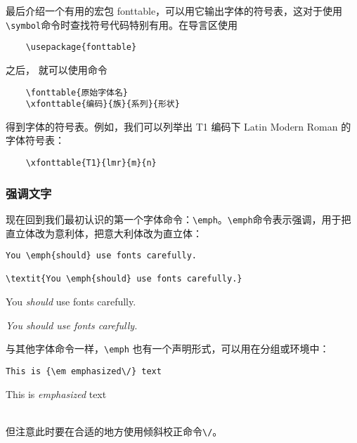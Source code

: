 最后介绍一个有用的宏包 fonttable，可以用它输出字体的符号表，这对于使用\verb|\symbol|命令时查找符号代码特别有用。在导言区使用
\begin{lstlisting}
    \usepackage{fonttable}
\end{lstlisting}
之后， 就可以使用命令
\begin{lstlisting}
    \fonttable{原始字体名}
    \xfonttable{编码}{族}{系列}{形状}
\end{lstlisting}
得到字体的符号表。例如，我们可以列举出 T1 编码下 Latin Modern Roman 的字体符号表：
\begin{lstlisting}
    \xfonttable{T1}{lmr}{m}{n}
\end{lstlisting}


\subsubsection{强调文字}

现在回到我们最初认识的第一个字体命令：\verb|\emph|。\verb|\emph|命令表示强调，用于把直立体改为意利体，把意大利体改为直立体：

\begin{minipage}[t]{0.45\textwidth}
\begin{lstlisting}
You \emph{should} use fonts carefully.

\textit{You \emph{should} use fonts carefully.}
\end{lstlisting}
\end{minipage}
\hfill
\begin{minipage}[t]{0.45\textwidth}
    You \emph{should} use fonts carefully.
    
    \textit{You \emph{should} use fonts carefully.}
\end{minipage}

与其他字体命令一样，\verb|\emph| 也有一个声明形式，可以用在分组或环境中：

\begin{minipage}[t]{0.45\textwidth}
\begin{lstlisting}
This is {\em emphasized\/} text
\end{lstlisting}
\end{minipage}
\hfill
\begin{minipage}[t]{0.45\textwidth}
    This is {\em emphasized\/} text
\end{minipage} \\
但注意此时要在合适的地方使用倾斜校正命令\verb|\/|。

